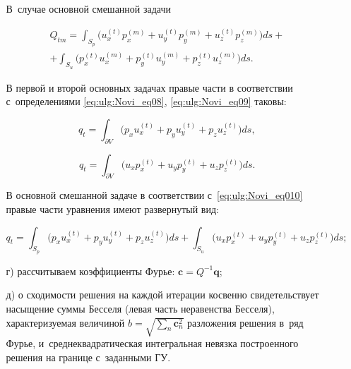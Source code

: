 \begin{enumerate}
\begin{itemize}
В~случае основной смешанной задачи 

\begin{multline}

{Q}_{tm} =\int _{S_{p} } \bigl(u_{x}^{(t)} p_{x}^{(m)} +u_{y}^{(t)} p_{y}^{(m)} +u_{z}^{(t)} p_{z}^{(m)} \bigr) ds + \\ 

+\int _{S_{u} } \bigl(p_{x}^{(t)} u_{x}^{(m)} +p_{y}^{(t)} u_{y}^{(m)} +p_{z}^{(t)} u_{z}^{(m)} \bigr) ds. 

\end{multline}

В первой и второй основных задачах правые части в соответствии с~определениями \eqref{eq:ulg:Novi_eq08}, \eqref{eq:ulg:Novi_eq09} таковы:

\[

{q}_{t} =\int _{\partial V} \bigl(p_{x} u_{x}^{(t)} +p_{y} u_{y}^{(t)} +p_{z} u_{z}^{(t)} \bigr)ds , 

\]

\[  {q}_{t} =\int _{\partial V} \bigl(u_{x}  p_{x}^{(t)} +u_{y} p_{y}^{(t)} +u_{z} p_{z}^{(t)} \bigr)ds .

\] 



В основной смешанной задаче в соответствии с~\eqref{eq:ulg:Novi_eq010} правые части уравнения имеют развернутый вид: 

\[

{q}_{t} =

\int _{S_{p} } \bigl(p_{x}  u_{x}^{(t)} +p_{y} u_{y}^{(t)} +p_{z} u_{z}^{(t)} \bigr)ds +

\int _{S_{u} } \bigl(u_{x}  p_{x}^{(t)} +u_{y} p_{y}^{(t)} +u_{z} p_{z}^{(t)} \bigr)ds ;

\] 



\item[г)] рассчитываем коэффициенты Фурье:  $\textbf{c}=Q^{-1} \textbf{q}$;



\item[д)] о сходимости решения на каждой итерации косвенно свидетельствует насыщение суммы Бесселя (левая часть неравенства Бесселя), характеризуемая величиной $b=\sqrt{\sum _{n}\textbf{c}_{n}^{2}  } $ разложения решения в~ряд Фурье, и~среднеквадратическая интегральная невязка построенного решения на границе с~заданными ГУ. 





\end{itemize}




\end{enumerate}

